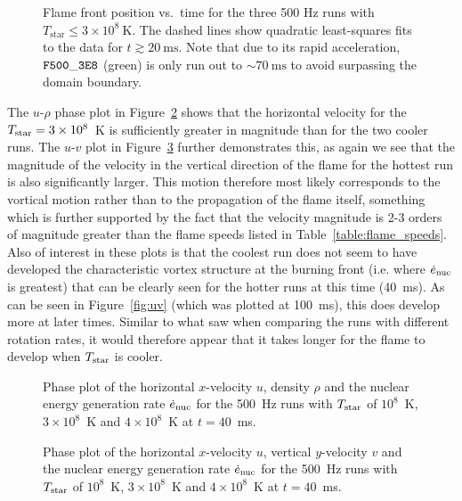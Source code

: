 \documentclass[preprint,times,tighten]{aastex63}
\newcommand{\MarginPar}[1]{
    \marginpar{\vskip-\baselineskip%
               \raggedright%
               \tiny\sffamily%
               {\color{red}\hrule%
               \smallskip%
               #1\par%
               \smallskip%
               \hrule}}%
}
\begin{document}
\begin{figure}[t]
	\centering
	\caption{\label{fig:flame_speeds_2} Flame front position vs.\ time for the three 500 Hz runs with
		$T_{\mathrm{star}} \leq 3 \times 10^8~\mathrm{K}$. The dashed lines show quadratic least-squares fits to the data
		for $t \gtrsim 20~\mathrm{ms}$. Note that due to its rapid acceleration, $\tt{F500\_3E8}$ 
		(green) is only run out to $\sim 70~\mathrm{ms}$ to avoid surpassing the domain boundary.}
\end{figure}

The $u$-$\rho$ phase plot in Figure~\ref{fig:urho_hot} shows that the horizontal velocity for the $T_{\rm star} = 3\times10^8$~K is sufficiently  \MarginPar{should this say "significantly"?} greater in magnitude than for the two cooler runs. The $u$-$v$ plot in Figure~\ref{fig:uv_hot} further demonstrates this, as again we see that the magnitude of the velocity in the vertical direction of the flame for the hottest run is also significantly larger. This motion therefore most likely corresponds to the vortical motion rather than to the propagation of the flame itself, something which is further supported by the fact that the velocity magnitude is 2-3 orders of magnitude greater than the flame speeds listed in Table~\ref{table:flame_speeds}. Also of interest in these plots is that the coolest run does not seem to have developed the characteristic vortex structure at the burning front (i.e. where $\dot{e}_{\rm nuc}$ is greatest) that can be clearly seen for the hotter runs at this time (40~ms). As can be seen in Figure~\ref{fig:uv} (which was plotted at 100~ms), this does develop more at later times. Similar to what saw when comparing the runs with different rotation rates, it would therefore appear that it takes longer for the flame to develop when $T_{\rm star}$ is cooler. 

\begin{figure}[t]
    \centering
    \caption{\label{fig:urho_hot}Phase plot of the horizontal $x$-velocity $u$, density $\rho$ and the nuclear energy generation rate $\dot{e}_{\rm nuc}$ for the 500~Hz runs with $T_{\rm star}$ of $10^8$~K, $3\times10^8$~K and $4\times10^8$~K at $t = 40$~ms.}
\end{figure}

\begin{figure}[t]
    \centering
    \caption{\label{fig:uv_hot}Phase plot of the horizontal $x$-velocity $u$, vertical $y$-velocity $v$ and the nuclear energy generation rate $\dot{e}_{\rm nuc}$ for the 500~Hz runs with $T_{\rm star}$ of $10^8$~K, $3\times10^8$~K and $4\times10^8$~K at $t = 40$~ms.}
\end{figure}
\end{document}
